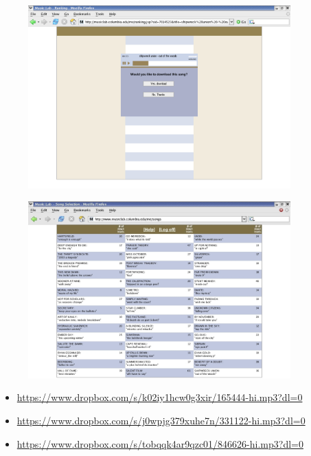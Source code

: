 \documentclass[aspectratio=169]{beamer}
\begin{document}
\begin{frame}

\begin{figure}
  \centering
  \includegraphics[width = 0.9\textwidth]{figures/downloadscreen}
\end{figure}

\end{frame}
\begin{frame}

\begin{figure}
  \centering
  \includegraphics[width = 0.9\textwidth]{figures/info-v1-cut}
\end{figure}

\end{frame}
\begin{frame}

\begin{itemize}
\item \url{https://www.dropbox.com/s/k02iy1hcw0g3xir/165444-hi.mp3?dl=0}
\item \url{https://www.dropbox.com/s/j0wpjg379xuhe7n/331122-hi.mp3?dl=0}
\item \url{https://www.dropbox.com/s/tobqqk4ar9qzc01/846626-hi.mp3?dl=0}
\end{itemize}

\end{frame}
\end{document}
